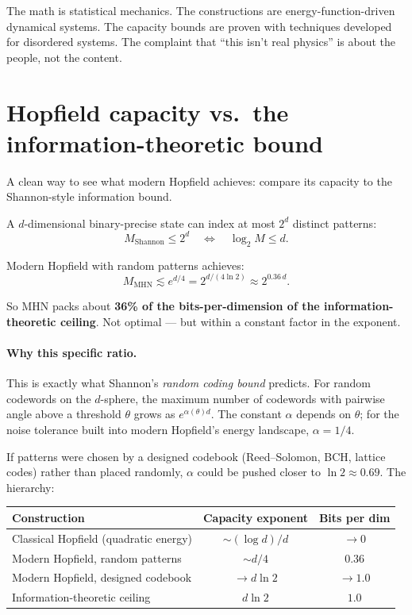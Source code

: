 \documentclass[11pt,a4paper]{article}
\begin{document}
The math is statistical mechanics. The constructions are
energy-function-driven dynamical systems. The capacity bounds are
proven with techniques developed for disordered systems. The complaint
that ``this isn't real physics'' is about the people, not the content.

\section{Hopfield capacity vs.\ the information-theoretic bound}

A clean way to see what modern Hopfield achieves: compare its capacity
to the Shannon-style information bound.

A $d$-dimensional binary-precise state can index at most $2^d$ distinct
patterns:
\[
M_{\text{Shannon}} \le 2^d
\quad\Leftrightarrow\quad
\log_2 M \le d.
\]

Modern Hopfield with random patterns achieves:
\[
M_{\text{MHN}} \lesssim e^{d/4} = 2^{d / (4 \ln 2)} \approx 2^{0.36\, d}.
\]

So MHN packs about \textbf{36\% of the bits-per-dimension of the
information-theoretic ceiling}. Not optimal --- but within a constant
factor in the exponent.

\paragraph{Why this specific ratio.} This is exactly what Shannon's
\emph{random coding bound} predicts. For random codewords on the
$d$-sphere, the maximum number of codewords with pairwise angle above a
threshold $\theta$ grows as $e^{\alpha(\theta) d}$. The constant
$\alpha$ depends on $\theta$; for the noise tolerance built into
modern Hopfield's energy landscape, $\alpha = 1/4$.

If patterns were chosen by a designed codebook (Reed--Solomon, BCH,
lattice codes) rather than placed randomly, $\alpha$ could be pushed
closer to $\ln 2 \approx 0.69$. The hierarchy:

\begin{center}
\begin{tabular}{lcc}
\toprule
Construction & Capacity exponent & Bits per dim \\
\midrule
Classical Hopfield (quadratic energy)     & $\sim (\log d) / d$ & $\to 0$ \\
Modern Hopfield, random patterns          & $\sim d / 4$        & $0.36$ \\
Modern Hopfield, designed codebook        & $\to d \ln 2$       & $\to 1.0$ \\
Information-theoretic ceiling             & $d \ln 2$           & $1.0$ \\
\bottomrule
\end{tabular}
\end{center}
\end{document}
